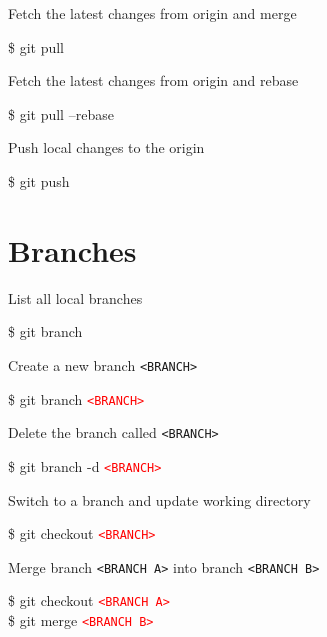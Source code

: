 \documentclass[10pt,a4paper]{article}
\newenvironment{cheatentry}{%
    \noindent%
    \begin{minipage}{\columnwidth}%
    \small%
    \noindent%
}{%
    \end{minipage}%
}
\newenvironment{cheatcmde}{%
    \noindent%
    \begin{cmdbox}%
    \begin{flushleft}%
    \bgroup%
    \setlength{\parindent}{-12pt}%
    \ttfamily\fontseries{b}\selectfont\large%
    \hspace{\parindent}%
}{%
    \egroup%
    \end{flushleft}%
    \end{cmdbox}%
}
\newcommand{\entrysep}{\vspace{1em}}
\newcommand{\cheatcmd}[1]{%
    \begin{cheatcmde}#1\end{cheatcmde}
}
\newcommand{\cheatmetavar}[1]{%
    \textcolor{red}{\texttt{\textless{}#1\textgreater{}}}%
}
\newcommand{\cheatmetavarref}[1]{%
    {\texttt{\textless{}#1\textgreater{}}}%
}
\begin{document}
\begin{multicols}{4}
\entrysep{}%

\begin{cheatentry}%
Fetch the latest changes from origin and merge
\cheatcmd{\$ git pull}
\end{cheatentry}

\entrysep{}%

\begin{cheatentry}%
Fetch the latest changes from origin and rebase
\cheatcmd{\$ git pull --rebase}
\end{cheatentry}

\entrysep{}%

\begin{cheatentry}%
Push local changes to the origin
\cheatcmd{\$ git push}
\end{cheatentry}

\section{Branches}

\begin{cheatentry}%
List all local branches
\cheatcmd{\$ git branch}
\end{cheatentry}%

\entrysep{}%

\begin{cheatentry}%
Create a new branch \cheatmetavarref{BRANCH}
\cheatcmd{\$ git branch \cheatmetavar{BRANCH}}
\end{cheatentry}%

\entrysep{}%

\begin{cheatentry}%
Delete the branch called \cheatmetavarref{BRANCH}
\cheatcmd{\$ git branch -d \cheatmetavar{BRANCH}}
\end{cheatentry}

\entrysep{}%

\begin{cheatentry}%
Switch to a branch and update working directory
\cheatcmd{\$ git checkout \cheatmetavar{BRANCH}}
\end{cheatentry}

\entrysep{}%

\begin{cheatentry}%
Merge branch \cheatmetavarref{BRANCH~A} into branch \cheatmetavarref{BRANCH~B}
\cheatcmd{\$ git checkout \cheatmetavar{BRANCH~A}\\\$ git merge \cheatmetavar{BRANCH~B}}
\end{cheatentry}


\end{multicols}
\end{document}

